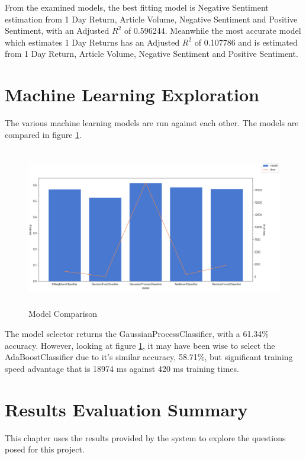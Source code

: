 From the examined models, the best fitting model is Negative Sentiment estimation from 1 Day Return, Article Volume, Negative Sentiment and Positive Sentiment, with an Adjusted $R^2$ of 0.596244. Meanwhile the most accurate model which estimates 1 Day Returns has an Adjusted $R^2$ of 0.107786 and is estimated from 1 Day Return, Article Volume, Negative Sentiment and Positive Sentiment.

\section{Machine Learning Exploration}

The various machine learning models are run against each other. The models are compared in figure \ref{fig:modelCompare}.

\begin{figure}[h!]
    \centering
    \includegraphics[width=15cm,height=7cm,keepaspectratio]{resultsEvaluation/modelCompare.png}
    \caption{Model Comparison}
    \label{fig:modelCompare}
\end{figure}

The model selector returns the GaussianProcessClassifier, with a 61.34\% accuracy. However, looking at figure \ref{fig:modelCompare}, it may have been wise to select the AdaBoostClassifier due to it's similar accuracy, 58.71\%, but significant training speed advantage that is 18974 ms against 420 ms training times.


\section{Results Evaluation Summary}

This chapter uses the results provided by the system to explore the questions posed for this project.